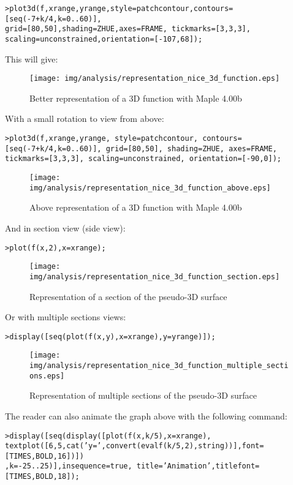 \texttt{>plot3d(f,xrange,yrange,style=patchcontour,contours=[seq(-7+k/4,k=0..60)],\\
grid=[80,50],shading=ZHUE,axes=FRAME, tickmarks=[3,3,3],\\ scaling=unconstrained,orientation=[-107,68]);}

This will give:

\begin{figure}[H]
\centering
\texttt{[image: img/analysis/representation\_nice\_3d\_function.eps]}
\caption{Better representation of a 3D function with Maple 4.00b}
\end{figure}

With a small rotation to view from above:

\texttt{>plot3d(f,xrange,yrange, style=patchcontour, contours=[seq(-7+k/4,k=0..60)], grid=[80,50], shading=ZHUE, axes=FRAME, tickmarks=[3,3,3], scaling=unconstrained, orientation=[-90,0]);}

\begin{figure}[H]
\centering
\texttt{[image: img/analysis/representation\_nice\_3d\_function\_above.eps]}
\caption[]{Above representation of a 3D function with Maple 4.00b}
\end{figure}

And in section view (side view):

\texttt{>plot(f(x,2),x=xrange);}

\begin{figure}[H]
\centering
\texttt{[image: img/analysis/representation\_nice\_3d\_function\_section.eps]}
\caption{Representation of a section of the pseudo-3D surface}
\end{figure}

Or with multiple sections views:

\texttt{>display([seq(plot(f(x,y),x=xrange),y=yrange)]);}

\begin{figure}[H]
\centering
\texttt{[image: img/analysis/representation\_nice\_3d\_function\_multiple\_sections.eps]}
\caption{Representation of multiple sections of the pseudo-3D surface}
\end{figure}

The reader can also animate the graph above with the following command:

\texttt{>display([seq(display([plot(f(x,k/5),x=xrange),}\\ \texttt{textplot([6,5,cat('y=',convert(evalf(k/5,2),string))],font=[TIMES,BOLD,16])])}\\
\texttt{,k=-25..25)],insequence=true, title='Animation',titlefont=[TIMES,BOLD,18]);}


